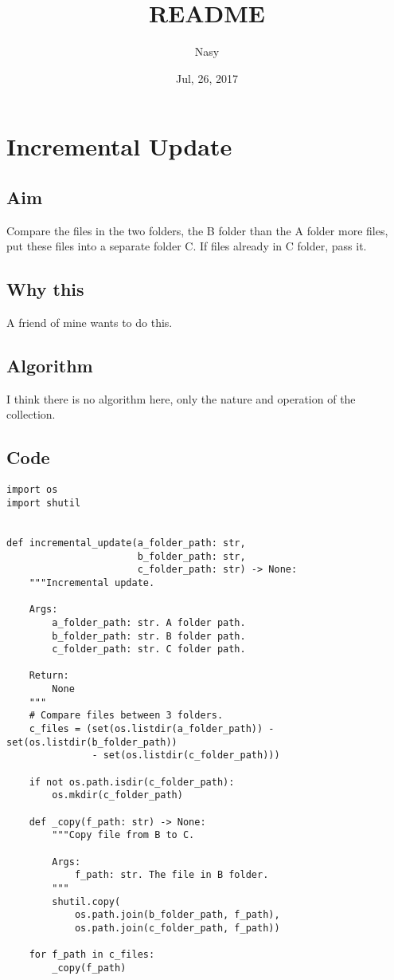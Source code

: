 \documentclass[11pt]{article}
\author{Nasy}
\date{Jul, 26, 2017}
\title{README}
\begin{document}
\maketitle

\section{Incremental Update}
\label{sec-1}

\subsection{Aim}
\label{sec-1-1}
Compare the files in the two folders, the B folder than the A folder more files, put these files into a separate folder C. If files already in C folder, pass it.

\subsection{Why this}
\label{sec-1-2}
A friend of mine wants to do this.

\subsection{Algorithm}
\label{sec-1-3}
I think there is no algorithm here, only the nature and operation of the collection.

\subsection{Code}
\label{sec-1-4}

\begin{verbatim}
import os
import shutil


def incremental_update(a_folder_path: str,
                       b_folder_path: str,
                       c_folder_path: str) -> None:
    """Incremental update.

    Args:
        a_folder_path: str. A folder path.
        b_folder_path: str. B folder path.
        c_folder_path: str. C folder path.

    Return:
        None
    """
    # Compare files between 3 folders.
    c_files = (set(os.listdir(a_folder_path)) - set(os.listdir(b_folder_path))
               - set(os.listdir(c_folder_path)))

    if not os.path.isdir(c_folder_path):
        os.mkdir(c_folder_path)

    def _copy(f_path: str) -> None:
        """Copy file from B to C.

        Args:
            f_path: str. The file in B folder.
        """
        shutil.copy(
            os.path.join(b_folder_path, f_path),
            os.path.join(c_folder_path, f_path))

    for f_path in c_files:
        _copy(f_path)
\end{verbatim}
\end{document}
